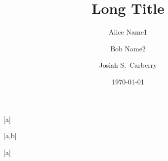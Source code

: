 \title[Short Title]{Long Title}

\author[A.~Name1]{Alice Name1}[a]
\author[B.~Name2]{Bob Name2}[a,b]
\author[J.~Name3]{Josiah S.~Carberry}[a]

\address{University 1, address1}	%

\address{University 2, address2}	%

\date{\today}



\newcommand{\acknowledge}{
    \thanks{Acknowledge}
}

\newcommand{\makeabstract}{
    \begin{abstract}
        Abstract of the paper.
    \end{abstract}
}
